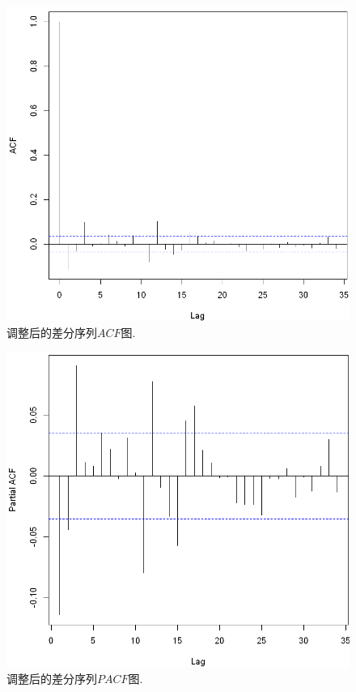 \documentclass[11pt]{article}
\begin{document}
\begin{center}
    \hspace{30pt}\begin{minipage}{0.45\textwidth}
        \begin{figure}
            \centering
            \hspace{-25pt}\includegraphics[width=.9\textwidth]{output_30_0}
            \caption{调整后的差分序列$ACF$图.\label{fig:11}}
        \end{figure}
    \end{minipage}
    \begin{minipage}{0.45\textwidth}
        \begin{figure}
            \centering
            \hspace{-25pt}\includegraphics[width=.9\textwidth]{output_30_1}
            \caption{调整后的差分序列$PACF$图.\label{fig:12}}
        \end{figure}
    \end{minipage}
\end{center}
\end{document}
